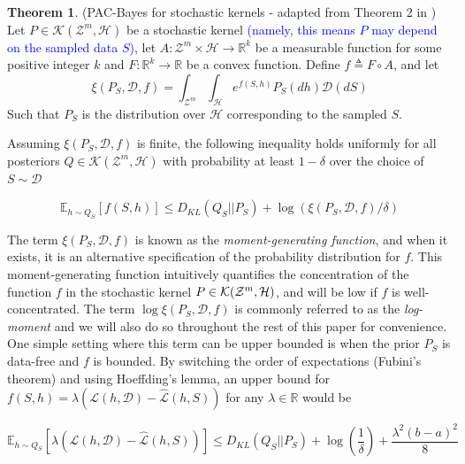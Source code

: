 \documentclass{article}
\theoremstyle{definition}
\newtheorem{theorem}{Theorem}[section]
\newcommand{\Expect}[2]{\mathbb{E}_{#1}\left [#2 \right ]}
\newcommand{\LFe}[1]{\textcolor{blue}{#1}}
\begin{document}
\begin{theorem} (PAC-Bayes for stochastic kernels - adapted from Theorem 2 in \citet{Rivasplata2020}) \label{thm:rivasplata-pb}
	Let $P\in \mathcal{K}(\mathcal{Z}^m, \mathcal{H})$ be a stochastic kernel \LFe{(namely, this means $P$ may depend on the sampled data $S$)}, let $A: \mathcal{Z}^m\times \mathcal{H}\rightarrow \mathbb{R}^k$ be a measurable function for some positive integer $k$ and $F:\mathbb{R}^k\rightarrow \mathbb{R}$ be a convex function.
	Define $f\triangleq F\circ A$, and let 
	$$\xi(P_S, \mathcal{D}, f)=\int_{\mathcal{Z}^m}\int_{\mathcal{H}}e^{f(S, h)}P_S(dh)\mathcal{D}(dS)$$
	Such that $P_S$ is the distribution over $\mathcal{H}$ corresponding to the sampled $S$.
	
	Assuming $\xi(P_S, \mathcal{D}, f)$ is finite, the following inequality holds uniformly for all posteriors $Q\in \mathcal{K}(\mathcal{Z}^m, \mathcal{H})$ with probability at least $1-\delta$ over the choice of $S\sim \mathcal{D}$
	
	\begin{equation} \label{eq:ribasplata-pb}
	\Expect{h\sim Q_S}{f(S, h)} \leq D_{KL}(Q_S||P_S)+\log\left (\xi(P_S, \mathcal{D}, f)/\delta\right )
	\end{equation}
\end{theorem}

The term $\xi(P_S, \mathcal{D}, f)$ is known as the \emph{moment-generating function}, and when it exists, it is an alternative specification of the probability distribution for $f$.
This moment-generating function intuitively quantifies the concentration of the function $f$ in the stochastic kernel $P\in{\cal K}({\cal Z}^m,{\cal H})$, and will be low if $f$ is well-concentrated.
The term $\log\xi(P_S, \mathcal{D}, f)$ is commonly referred to as the \emph{log-moment} and we will also do so throughout the rest of this paper for convenience. 
One simple setting where this term can be upper bounded is when the prior $P_S$ is data-free and $f$ is bounded. By switching the order of expectations (Fubini's theorem) and using Hoeffding's lemma, an upper bound for $f(S,h)=\lambda(\mathcal{L}(h,\mathcal{D})-\hat{\mathcal{L}}(h, S))$ for any $\lambda\in \mathbb{R}$ would be

\begin{equation} \label{eq:bound-aml-datafree}
\Expect{h\sim Q_S}{\lambda(\mathcal{L}(h,\mathcal{D})-\hat{\mathcal{L}}(h, S))} \leq D_{KL}(Q_S||P_S)+\log\left (\frac{1}{\delta}\right ) + \frac{\lambda^2(b-a)^2}{8}
\end{equation}
\end{document}
